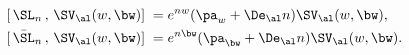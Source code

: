 \begin{equation}
\begin{aligned}
{[}\,\SL_n\, ,\, \SV_{\al}(w,\bw){]}\;=\;& 
    e^{nw}(\pa_w+\De_{\al}n)\SV_{\al}(w,\bw),\\
{[}\,\bar{\SL}_n\, ,\, \SV_{\al}(w,\bw){]}\;=\;&
    e^{n\bw}(\pa_{\bw}+\De_{\al}n)\SV_{\al}(w,\bw).
\end{aligned}
\end{equation}

